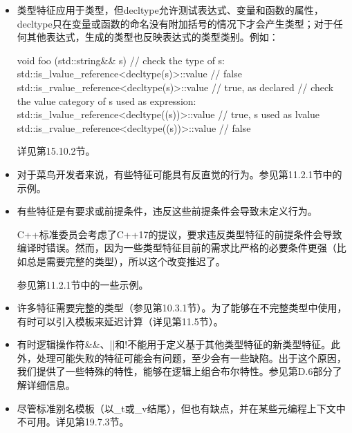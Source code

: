\begin{itemize}
\item 
类型特征应用于类型，但decltype允许测试表达式、变量和函数的属性，decltype只在变量或函数的命名没有附加括号的情况下才会产生类型；对于任何其他表达式，生成的类型也反映表达式的类型类别。例如：

\begin{cpp}
void foo (std::string&& s) {
	// check the type of s:
	std::is_lvalue_reference<decltype(s)>::value // false
	std::is_rvalue_reference<decltype(s)>::value // true, as declared
	// check the value category of s used as expression:
	std::is_lvalue_reference<decltype((s))>::value // true, s used as lvalue
	std::is_rvalue_reference<decltype((s))>::value // false
}
\end{cpp}

详见第15.10.2节。

\item 
对于菜鸟开发者来说，有些特征可能具有反直觉的行为。参见第11.2.1节中的示例。

\item 
有些特征是有要求或前提条件，违反这些前提条件会导致未定义行为。

\begin{notice}
C++标准委员会考虑了C++17的提议，要求违反类型特征的前提条件会导致编译时错误。然而，因为一些类型特征目前的需求比严格的必要条件更强（比如总是需要完整的类型），所以这个改变推迟了。
\end{notice}

参见第11.2.1节中的一些示例。

\item 
许多特征需要完整的类型（参见第10.3.1节）。为了能够在不完整类型中使用，有时可以引入模板来延迟计算（详见第11.5节）。

\item 
有时逻辑操作符\&\&、||和!不能用于定义基于其他类型特征的新类型特征。此外，处理可能失败的特征可能会有问题，至少会有一些缺陷。出于这个原因，我们提供了一些特殊的特性，能够在逻辑上组合布尔特性。参见第D.6部分了解详细信息。

\item 
尽管标准别名模板（以\_t或\_v结尾），但也有缺点，并在某些元编程上下文中不可用。详见第19.7.3节。
\end{itemize}



